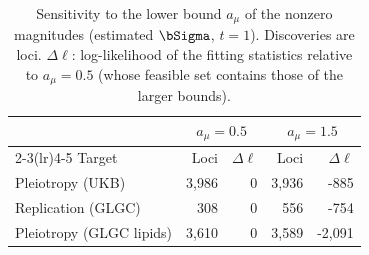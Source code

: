 \begin{table}[!htbp]
\centering
\caption{Sensitivity to the lower bound $a_\mu$ of the nonzero magnitudes (estimated $\bSigma$, $t=1$). Discoveries are loci. $\Delta\ell$: log-likelihood of the fitting statistics relative to $a_\mu=0.5$ (whose feasible set contains those of the larger bounds).}\label{tab:realdata-amu}
\small
\begin{tabular}{l rr rr}
\toprule
 & \multicolumn{2}{c}{$a_\mu=0.5$} & \multicolumn{2}{c}{$a_\mu=1.5$}\\
\cmidrule(lr){2-3}\cmidrule(lr){4-5}
Target & Loci & $\Delta\ell$ & Loci & $\Delta\ell$\\
\midrule
Pleiotropy (UKB) & 3{,}986 & 0 & 3{,}936 & -885\\
Replication (GLGC) & 308 & 0 & 556 & -754\\
Pleiotropy (GLGC lipids) & 3{,}610 & 0 & 3{,}589 & -2{,}091\\
\bottomrule
\end{tabular}
\end{table}
